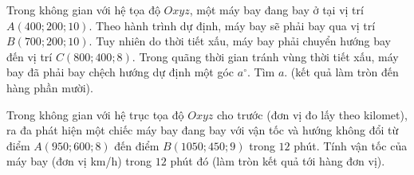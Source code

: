 \begin{bt}%
	Trong không gian với hệ tọa độ $Oxyz$, một máy bay đang bay ở tại vị trí $A(400; 200; 10)$. Theo hành trình dự định, máy bay sẽ phải bay qua vị trí $B(700; 200; 10)$. Tuy nhiên do thời tiết xấu, máy bay phải chuyển hướng bay đến vị trí $C(800; 400; 8)$. Trong quãng thời gian tránh vùng thời tiết xấu, máy bay đã phải bay chệch hướng dự định một góc $a^{\circ}$. Tìm $a$. (kết quả làm tròn đến hàng phần mười).
\end{bt}

\begin{bt}%
	Trong không gian với hệ trục tọa độ $Oxyz$ cho trước (đơn vị đo lấy theo kilomet), ra đa phát hiện một chiếc máy bay đang bay với vận tốc và hướng không đổi từ điểm $A(950;600;8)$ đến điểm $B(1050;450;9)$ trong $12$ phút. Tính vận tốc của máy bay (đơn vị km/h) trong $12$ phút đó (làm tròn kết quả tới hàng đơn vị).
\end{bt}

